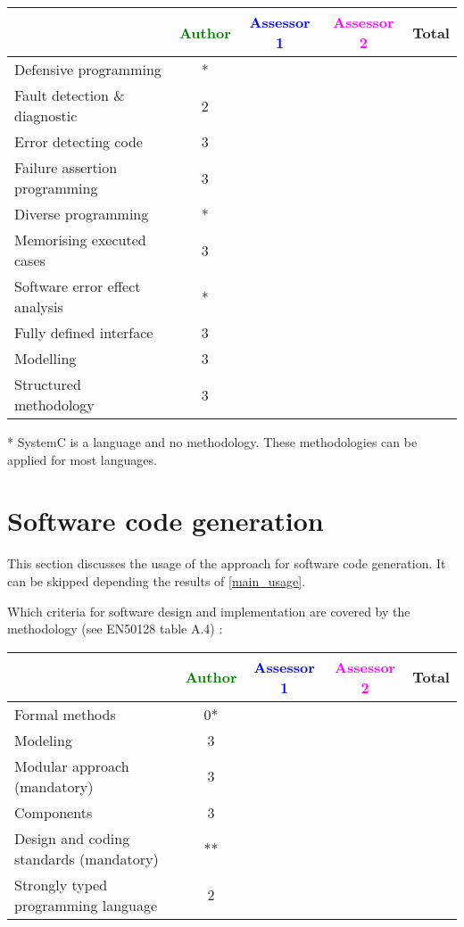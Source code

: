 \begin{tabular}{|l | c | c | c | c|}
\hline
& \textcolor{green}{Author} & \textcolor{blue}{Assessor 1} & \textcolor{magenta}{Assessor 2} & Total \\
\hline
Defensive programming &* & & & \\
\hline
Fault detection \& diagnostic &2 & & & \\
\hline
Error detecting code &3 & & & \\
\hline
Failure assertion programming &3 & & & \\
\hline
Diverse programming &* & & & \\
\hline
Memorising executed cases &3 & & & \\
\hline
Software error effect analysis &* & & & \\
\hline
Fully defined interface &3 & & & \\
\hline
Modelling &3 & & & \\
\hline
Structured methodology &3 & & & \\
\hline
\end{tabular}

\begin{author_comment}
 * SystemC is a language and no methodology. These methodologies can be applied for most languages.
\end{author_comment}

\section{Software code generation}
This section discusses the usage of the approach for software code generation.
It can be skipped depending the results of \ref{main_usage}.

Which criteria for software design and implementation are covered by the methodology
(see EN50128 table A.4) :

\begin{tabular}{|l | c | c | c | c|}
\hline
& \textcolor{green}{Author} & \textcolor{blue}{Assessor 1} & \textcolor{magenta}{Assessor 2} & Total \\
\hline
Formal methods &0* & & & \\
\hline
Modeling &3 & & & \\
\hline
Modular approach (mandatory) &3 & & & \\
\hline
Components &3 & & & \\
\hline
Design and coding standards (mandatory) &** & & & \\
\hline
Strongly typed programming language &2 & & & \\
\hline

\end{tabular}

